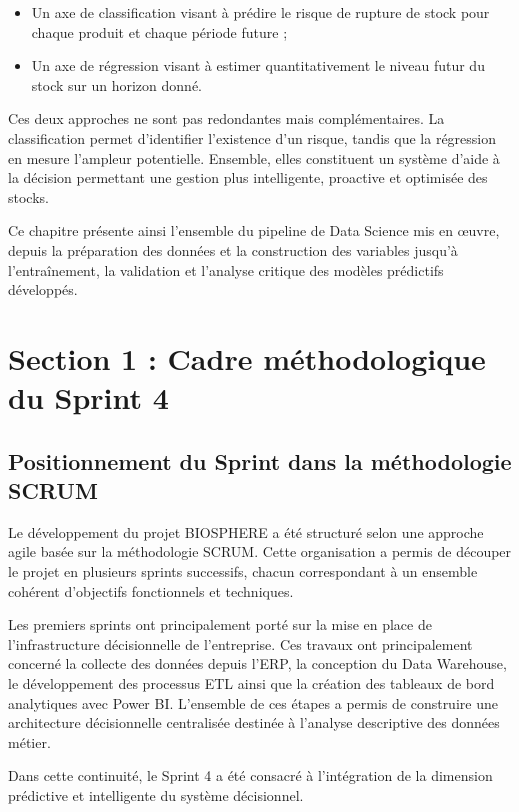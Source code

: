 \begin{itemize}
    \item Un axe de classification visant à prédire le risque de rupture de stock pour chaque produit et chaque période future ;
    \item Un axe de régression visant à estimer quantitativement le niveau futur du stock sur un horizon donné.
\end{itemize}
 
Ces deux approches ne sont pas redondantes mais complémentaires. La classification permet d'identifier l'existence d'un risque, tandis que la régression en mesure l'ampleur potentielle. Ensemble, elles constituent un système d'aide à la décision permettant une gestion plus intelligente, proactive et optimisée des stocks.
 
Ce chapitre présente ainsi l'ensemble du pipeline de Data Science mis en œuvre, depuis la préparation des données et la construction des variables jusqu'à l'entraînement, la validation et l'analyse critique des modèles prédictifs développés.
 
\section{Section 1 : Cadre méthodologique du Sprint 4}
 
\subsection{Positionnement du Sprint dans la méthodologie SCRUM}
 
Le développement du projet BIOSPHERE a été structuré selon une approche agile basée sur la méthodologie SCRUM. Cette organisation a permis de découper le projet en plusieurs sprints successifs, chacun correspondant à un ensemble cohérent d'objectifs fonctionnels et techniques.
 
Les premiers sprints ont principalement porté sur la mise en place de l'infrastructure décisionnelle de l'entreprise. Ces travaux ont principalement concerné la collecte des données depuis l'ERP, la conception du Data Warehouse, le développement des processus ETL ainsi que la création des tableaux de bord analytiques avec Power BI. L'ensemble de ces étapes a permis de construire une architecture décisionnelle centralisée destinée à l'analyse descriptive des données métier.
 
Dans cette continuité, le Sprint 4 a été consacré à l'intégration de la dimension prédictive et intelligente du système décisionnel. 
 
